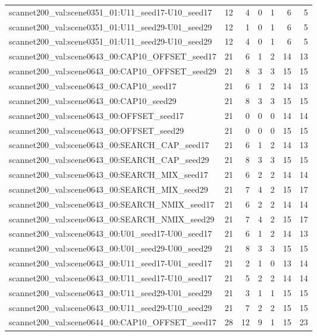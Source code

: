 \begin{table}[t]
\begin{tabular}{lrrrrrr}
scannet200\_val:scene0351\_01:U11\_seed17-U10\_seed17 & 12 & 4 & 0 & 1 & 6 & 5 \\
scannet200\_val:scene0351\_01:U11\_seed29-U01\_seed29 & 12 & 1 & 0 & 1 & 6 & 5 \\
scannet200\_val:scene0351\_01:U11\_seed29-U10\_seed29 & 12 & 4 & 0 & 1 & 6 & 5 \\
scannet200\_val:scene0643\_00:CAP10\_OFFSET\_seed17 & 21 & 6 & 1 & 2 & 14 & 13 \\
scannet200\_val:scene0643\_00:CAP10\_OFFSET\_seed29 & 21 & 8 & 3 & 3 & 15 & 15 \\
scannet200\_val:scene0643\_00:CAP10\_seed17 & 21 & 6 & 1 & 2 & 14 & 13 \\
scannet200\_val:scene0643\_00:CAP10\_seed29 & 21 & 8 & 3 & 3 & 15 & 15 \\
scannet200\_val:scene0643\_00:OFFSET\_seed17 & 21 & 0 & 0 & 0 & 14 & 14 \\
scannet200\_val:scene0643\_00:OFFSET\_seed29 & 21 & 0 & 0 & 0 & 15 & 15 \\
scannet200\_val:scene0643\_00:SEARCH\_CAP\_seed17 & 21 & 6 & 1 & 2 & 14 & 13 \\
scannet200\_val:scene0643\_00:SEARCH\_CAP\_seed29 & 21 & 8 & 3 & 3 & 15 & 15 \\
scannet200\_val:scene0643\_00:SEARCH\_MIX\_seed17 & 21 & 6 & 2 & 2 & 14 & 14 \\
scannet200\_val:scene0643\_00:SEARCH\_MIX\_seed29 & 21 & 7 & 4 & 2 & 15 & 17 \\
scannet200\_val:scene0643\_00:SEARCH\_NMIX\_seed17 & 21 & 6 & 2 & 2 & 14 & 14 \\
scannet200\_val:scene0643\_00:SEARCH\_NMIX\_seed29 & 21 & 7 & 4 & 2 & 15 & 17 \\
scannet200\_val:scene0643\_00:U01\_seed17-U00\_seed17 & 21 & 6 & 1 & 2 & 14 & 13 \\
scannet200\_val:scene0643\_00:U01\_seed29-U00\_seed29 & 21 & 8 & 3 & 3 & 15 & 15 \\
scannet200\_val:scene0643\_00:U11\_seed17-U01\_seed17 & 21 & 2 & 1 & 0 & 13 & 14 \\
scannet200\_val:scene0643\_00:U11\_seed17-U10\_seed17 & 21 & 5 & 2 & 2 & 14 & 14 \\
scannet200\_val:scene0643\_00:U11\_seed29-U01\_seed29 & 21 & 3 & 1 & 1 & 15 & 15 \\
scannet200\_val:scene0643\_00:U11\_seed29-U10\_seed29 & 21 & 7 & 2 & 2 & 15 & 15 \\
scannet200\_val:scene0644\_00:CAP10\_OFFSET\_seed17 & 28 & 12 & 9 & 1 & 15 & 23 \\

\end{tabular}
\end{table}
